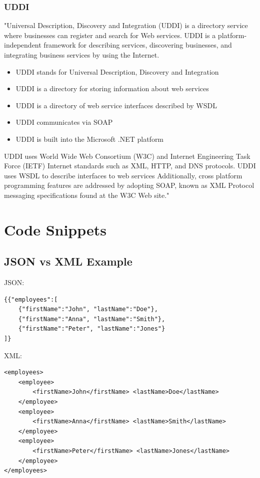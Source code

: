 \documentclass[12pt]{article}
\begin{document}
\subsubsection{UDDI}
"Universal Description, Discovery and Integration (UDDI) is a directory service where businesses can register and search for Web services.
UDDI is a platform-independent framework for describing services, discovering businesses, and integrating business services by using the Internet.\\
\begin{itemize}
\item UDDI stands for Universal Description, Discovery and Integration
\item UDDI is a directory for storing information about web services
\item UDDI is a directory of web service interfaces described by WSDL
\item UDDI communicates via SOAP
\item UDDI is built into the Microsoft .NET platform
\end{itemize}
UDDI uses World Wide Web Consortium (W3C) and Internet Engineering Task Force (IETF) Internet standards such as XML, HTTP, and DNS protocols.
UDDI uses WSDL to describe interfaces to web services Additionally, cross platform programming features are addressed by adopting SOAP, known as XML Protocol messaging specifications found at the W3C Web site."\cite{uddi}
\section{Code Snippets}
\subsection{JSON vs XML Example}
JSON:
\begin{lstlisting}
{{"employees":[
    {"firstName":"John", "lastName":"Doe"}, 
    {"firstName":"Anna", "lastName":"Smith"},
    {"firstName":"Peter", "lastName":"Jones"}
]}
\end{lstlisting}
XML:
\begin{lstlisting}
<employees>
    <employee>
        <firstName>John</firstName> <lastName>Doe</lastName>
    </employee>
    <employee>
        <firstName>Anna</firstName> <lastName>Smith</lastName>
    </employee>
    <employee>
        <firstName>Peter</firstName> <lastName>Jones</lastName>
    </employee>
</employees>
\end{lstlisting}
\end{document}
